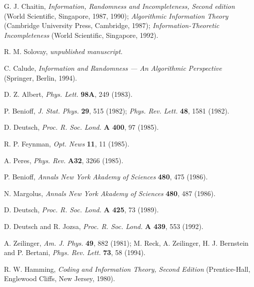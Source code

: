 \begin{thebibliography}{99}



G. J. Chaitin, {\sl Information, Randomness and Incompleteness, Second
edition}
(World Scientific, Singapore, 1987, 1990);
{\sl Algorithmic Information Theory}
(Cambridge University Press, Cambridge, 1987);
{\sl Information-Theoretic Incompleteness}
(World Scientific, Singapore, 1992).

R. M. Solovay, {\it unpublished manuscript}.

C. Calude,
{\sl Information and Randomness --- An Algorithmic Perspective}
(Springer, Berlin, 1994).


 D. Z. Albert, {\sl Phys. Lett.} {\bf 98A}, 249 (1983).

 P. Benioff, {\sl J. Stat. Phys.} {\bf 29}, 515 (1982);
{\sl Phys. Rev. Lett.} {\bf 48}, 1581 (1982).

 D. Deutsch, {\sl Proc. R. Soc. Lond.} {\bf A 400}, 97 (1985).

R. P. Feynman, {\sl Opt. News} {\bf 11}, 11 (1985).

 A. Peres, {\sl Phys. Rev.} {\bf A32}, 3266 (1985).

 P. Benioff, {\sl Annals New York Akademy of Sciences} {\bf 480}, 475
 (1986).

 N. Margolus, {\sl Annals New York Akademy of Sciences} {\bf 480}, 487
 (1986).

 D. Deutsch, {\sl Proc. R. Soc. Lond.} {\bf A 425}, 73 (1989).


 D. Deutsch and R. Jozsa, {\sl Proc. R. Soc. Lond.} {\bf A 439}, 553
(1992).

A. Zeilinger,
{\sl Am. J. Phys.} {\bf 49}, 882 (1981);
M. Reck, A. Zeilinger, H. J. Bernstein and P. Bertani,
{\sl Phys. Rev. Lett.} {\bf 73}, 58 (1994).

 R. W. Hamming, {\sl Coding and Information Theory, Second Edition}
 (Prentice-Hall, Englewood Cliffs, New Jersey, 1980).




\end{thebibliography}
